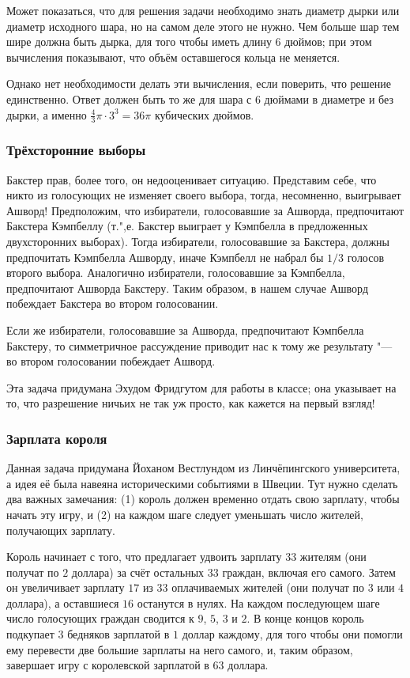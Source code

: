 \documentclass[twoside]{book}
\begin{document}
Может показаться, что для решения задачи необходимо знать диаметр дырки или диаметр исходного шара, но на самом деле этого не нужно.
Чем больше шар тем шире должна быть дырка, для того чтобы иметь длину 6 дюймов;
при этом вычисления показывают, что объём оставшегося кольца не меняется.

Однако нет необходимости делать эти вычисления, если поверить, что решение единственно.
Ответ должен быть то же для шара с 6 дюймами в диаметре и без дырки, а именно $\tfrac43 \pi \cdot 3^3=36\pi$ кубических дюймов.

\subsubsection*{Трёхсторонние выборы}%

Бакстер прав, более того, он недооценивает ситуацию.
Представим себе, что никто из голосующих не изменяет своего выбора, тогда, несомненно, выигрывает Ашворд!
Предположим, что избиратели, голосовавшие за Ашворда, предпочитают Бакстера Кэмпбеллу (т.",е. Бакстер выиграет у Кэмпбелла в предложенных двухсторонних выборах).
Тогда избиратели, голосовавшие за Бакстера, должны предпочитать
Кэмпбелла Ашворду, иначе Кэмпбелл не набрал бы $1/3$ голосов второго выбора.
Аналогично избиратели, голосовавшие за Кэмпбелла, предпочитают Ашворда
Бакстеру.
Таким образом, в нашем случае Ашворд побеждает Бакстера во втором
голосовании.

Если же избиратели, голосовавшие за Ашворда, предпочитают Кэмпбелла Бакстеру, то симметричное рассуждение приводит нас к тому же результату "--- во втором голосовании побеждает Ашворд.
\heart

Эта задача придумана Эхудом Фридгутом %
для работы в классе;
она указывает на то, что разрешение ничьих не так уж просто, как кажется на первый взгляд!

\subsubsection*{Зарплата короля}%

Данная задача придумана Йоханом Вестлундом %
из Линчёпингского университета, а идея её была навеяна историческими событиями в Швеции.
Тут нужно сделать два важных замечания: (1) король должен временно отдать свою зарплату, чтобы начать эту игру, и (2) на каждом шаге следует уменьшать число жителей, получающих зарплату.

Король начинает с того, что предлагает удвоить зарплату $33$ жителям (они получат по $2$ доллара) за счёт остальных $33$ граждан, включая его самого.
Затем он увеличивает зарплату $17$ из $33$ оплачиваемых жителей (они получат по $3$ или $4$ доллара), а оставшиеся $16$ останутся в нулях.
На каждом последующем шаге число голосующих граждан сводится к $9$, $5$, $3$ и $2$.
В конце концов король подкупает $3$ бедняков зарплатой в $1$ доллар каждому, для того чтобы они помогли ему перевести две большие зарплаты на него самого, и, таким образом, завершает игру с королевской зарплатой в $63$ доллара.
\end{document}
